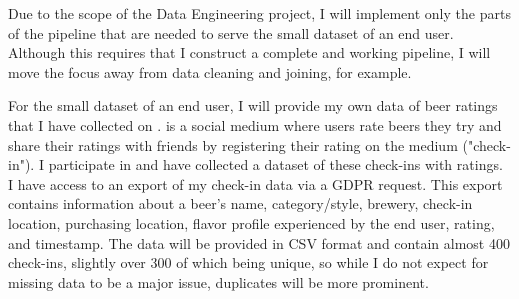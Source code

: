 \documentclass[sigconf, natbib=true]{acmart}
\begin{document}
Due to the scope of the Data Engineering project, I will implement only the parts of the pipeline that are needed to serve the small dataset of an end user.
Although this requires that I construct a complete and working pipeline, I will move the focus away from data cleaning and joining, for example.

For the small dataset of an end user, I will provide my own data of beer ratings that I have collected on \citeauthor{untappd}.
\citet{untappd} is a social medium where users rate beers they try and share their ratings with friends by registering their rating on the medium ("check-in").
I participate in \citeauthor{untappd} and have collected a dataset of these check-ins with ratings.
I have access to an export of my check-in data via a GDPR request.
This export contains information about a beer's name, category/style, brewery, check-in location, purchasing location, flavor profile experienced by the end user, rating, and timestamp.
The data will be provided in CSV format and contain almost 400 check-ins, slightly over 300 of which being unique, so while I do not expect for missing data to be a major issue, duplicates will be more prominent.

\end{document}
